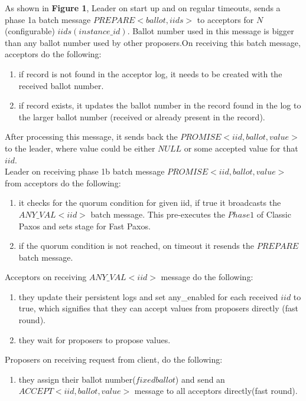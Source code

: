 As shown in \textbf{Figure 1}, Leader on start up and on regular timeouts, sends a phase 1a batch message $PREPARE<ballot, iids>$ to acceptors for $N$ (configurable) $iids(instance\_id)$. Ballot number used in this message is bigger than any ballot number used by other proposers.On receiving this batch message, acceptors do the following:
\begin{enumerate}
\item if record is not found in the acceptor log, it needs to be created with the received ballot number. 
\item if record exists, it updates the ballot number in the record found in the log to the larger ballot number (received or already present in the record).
\end{enumerate}
\noindent
After processing this message, it sends back the $PROMISE<iid, ballot, value>$ to the leader, where value could be either $NULL$ or some accepted value for that $iid$.\\

\noindent 
Leader on receiving phase 1b batch message $PROMISE<iid, ballot, value>$ from acceptors do the following:
\begin{enumerate}
\item it checks for the quorum condition for given iid, if true it broadcasts the $ANY\_VAL<iid>$ batch message. This pre-executes the $Phase1$ of Classic Paxos and sets stage for Fast Paxos.
\item if the quorum condition is not reached, on timeout it resends the $PREPARE$ batch message.
\end{enumerate}

\noindent
Acceptors on receiving $ANY\_VAL<iid>$ message do the following:
\begin{enumerate}
\item they update their persistent logs and set any\_enabled for each received $iid$ to true, which signifies that they can accept values from proposers directly (fast round).
\item they wait for proposers to propose values.
\end{enumerate}

\noindent
Proposers on receiving request from client, do the following:
\begin{enumerate}
\item they assign their ballot number($fixed ballot$) and send an $ACCEPT<iid, ballot, value>$ message to all acceptors directly(fast round).
\end{enumerate}

